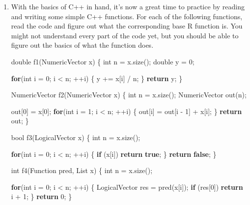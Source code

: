 \documentclass[]{book}
\newenvironment{Shaded}{\begin{snugshade}}{\end{snugshade}}
\newcommand{\ControlFlowTok}[1]{\textcolor[rgb]{0.27,0.27,0.27}{\textbf{#1}}}
\newcommand{\DataTypeTok}[1]{\textcolor[rgb]{0.27,0.27,0.27}{#1}}
\newcommand{\DecValTok}[1]{\textcolor[rgb]{0.06,0.06,0.06}{#1}}
\newcommand{\KeywordTok}[1]{\textcolor[rgb]{0.27,0.27,0.27}{\textbf{#1}}}
\newcommand{\NormalTok}[1]{#1}
\begin{document}
\begin{enumerate}
\def\labelenumi{\arabic{enumi}.}
\item
  With the basics of C++ in hand, it's now a great time to practice by reading
  and writing some simple C++ functions. For each of the following functions,
  read the code and figure out what the corresponding base R function is. You
  might not understand every part of the code yet, but you should be able to
  figure out the basics of what the function does.

\begin{Shaded}
\begin{Highlighting}[]
\DataTypeTok{double}\NormalTok{ f1(NumericVector x) \{}
  \DataTypeTok{int}\NormalTok{ n = x.size();}
  \DataTypeTok{double}\NormalTok{ y = }\DecValTok{0}\NormalTok{;}

  \ControlFlowTok{for}\NormalTok{(}\DataTypeTok{int}\NormalTok{ i = }\DecValTok{0}\NormalTok{; i < n; ++i) \{}
\NormalTok{    y += x[i] / n;}
\NormalTok{  \}}
  \ControlFlowTok{return}\NormalTok{ y;}
\NormalTok{\}}

\NormalTok{NumericVector f2(NumericVector x) \{}
  \DataTypeTok{int}\NormalTok{ n = x.size();}
\NormalTok{  NumericVector out(n);}

\NormalTok{  out[}\DecValTok{0}\NormalTok{] = x[}\DecValTok{0}\NormalTok{];}
  \ControlFlowTok{for}\NormalTok{(}\DataTypeTok{int}\NormalTok{ i = }\DecValTok{1}\NormalTok{; i < n; ++i) \{}
\NormalTok{    out[i] = out[i - }\DecValTok{1}\NormalTok{] + x[i];}
\NormalTok{  \}}
  \ControlFlowTok{return}\NormalTok{ out;}
\NormalTok{\}}

\DataTypeTok{bool}\NormalTok{ f3(LogicalVector x) \{}
  \DataTypeTok{int}\NormalTok{ n = x.size();}

  \ControlFlowTok{for}\NormalTok{(}\DataTypeTok{int}\NormalTok{ i = }\DecValTok{0}\NormalTok{; i < n; ++i) \{}
    \ControlFlowTok{if}\NormalTok{ (x[i]) }\ControlFlowTok{return} \KeywordTok{true}\NormalTok{;}
\NormalTok{  \}}
  \ControlFlowTok{return} \KeywordTok{false}\NormalTok{;}
\NormalTok{\}}

\DataTypeTok{int}\NormalTok{ f4(Function pred, List x) \{}
  \DataTypeTok{int}\NormalTok{ n = x.size();}

  \ControlFlowTok{for}\NormalTok{(}\DataTypeTok{int}\NormalTok{ i = }\DecValTok{0}\NormalTok{; i < n; ++i) \{}
\NormalTok{    LogicalVector res = pred(x[i]);}
    \ControlFlowTok{if}\NormalTok{ (res[}\DecValTok{0}\NormalTok{]) }\ControlFlowTok{return}\NormalTok{ i + }\DecValTok{1}\NormalTok{;}
\NormalTok{  \}}
  \ControlFlowTok{return} \DecValTok{0}\NormalTok{;}
\NormalTok{\}}


\end{Highlighting}
\end{Shaded}
\end{enumerate}
\end{document}
